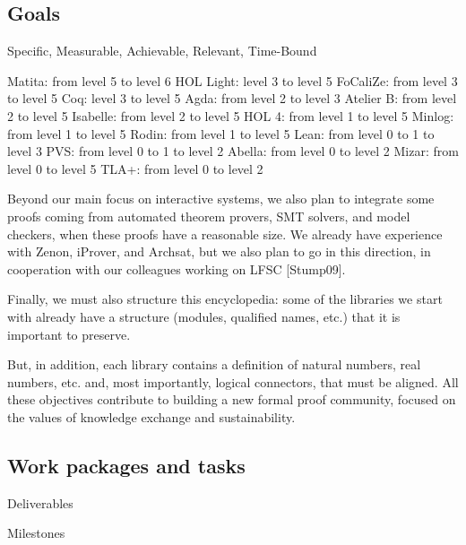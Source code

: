 \subsection{Goals}

Specific, Measurable, Achievable, Relevant, Time-Bound

Matita: from level 5 to level 6
HOL Light: level 3 to level 5
FoCaliZe: from level 3 to level 5
Coq: level 3 to level 5
Agda: from level 2 to level 3
Atelier B: from level 2 to level 5
Isabelle: from level 2 to level 5
HOL 4: from level 1 to level 5
Minlog: from level 1 to level 5
Rodin: from level 1 to level 5
Lean: from level 0 to 1 to level 3
PVS: from level 0 to 1 to level 2
Abella: from level 0 to level 2
Mizar: from level 0 to level 5
TLA+: from level 0 to level 2

Beyond our main focus on interactive systems, we also plan to
integrate some proofs coming from automated theorem provers, SMT
solvers, and model checkers, when these proofs have a reasonable
size. We already have experience with Zenon, iProver, and Archsat, but
we also plan to go in this direction, in cooperation with our
colleagues working on LFSC [Stump09].

Finally, we must also structure this encyclopedia: some of the
libraries we start with already have a structure (modules, qualified
names, etc.) that it is important to preserve.

But, in addition, each library contains a definition of natural
numbers, real numbers, etc. and, most importantly, logical connectors,
that must be aligned.  All these objectives contribute to building a
new formal proof community, focused on the values of knowledge
exchange and sustainability.


\subsection{Work packages and tasks}



Deliverables


Milestones

